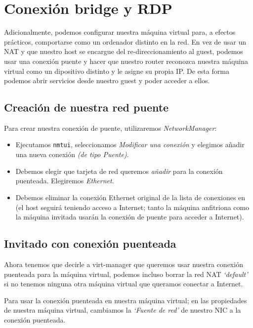 \documentclass[12pt]{article}
\begin{document}
\section{Conexión bridge y RDP}

Adicionalmente, podemos configurar nuestra máquina virtual para, a efectos prácticos, comportarse como un ordenador distinto en la red. En vez de usar un NAT y que nuestro host se encargue del re-direccionamiento al guest, podemos usar una conexión puente y hacer que nuestro router reconozca nuestra máquina virtual como un dipositivo distinto y le asigne su propia IP. De esta forma podemos abrir servicios desde nuestro guest y poder acceder a ellos.

\subsection{Creación de nuestra red puente}

Para crear nuestra conexión de puente, utilizaremos \emph{NetworkManager}:

\begin{itemize}
	\item Ejecutamos \texttt{nmtui}, seleccionamos \emph{Modificar una conexión} y elegimos añadir una nueva conexión \emph{(de tipo Puente)}.
	\item Debemos elegir que tarjeta de red queremos \emph{añadir} para la conexión puenteada. Elegiremos \emph{Ethernet}.
	\item Debemos eliminar la conexión Ethernet original de la lista de conexiones en (el host seguirá teniendo acceso a Internet; tanto la máquina anfitriona como la máquina invitada usarán la conexión de puente para acceder a Internet).
\end{itemize}

\subsection{Invitado con conexión puenteada}

Ahora tenemos que decirle a virt-manager que queremos usar nuestra conexión puenteada para la máquina virtual, podemos incluso borrar la red NAT \emph{`default'} si no tenemos ninguna otra máquina virtual que queramos conectar a Internet.

\medskip
Para usar la conexión puenteada en nuestra máquina virtual; en las propiedades de nuestra máquina virtual, cambiamos la \emph{`Fuente de red'} de nuestro NIC a la conexión puenteada.
\end{document}
